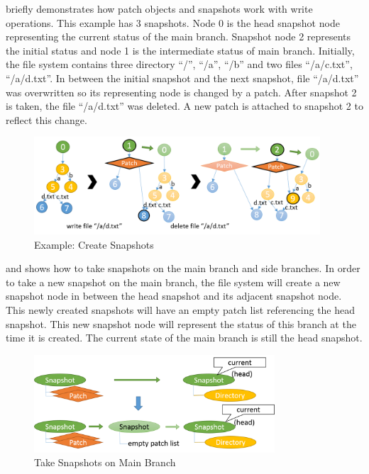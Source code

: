 	 briefly demonstrates how patch objects and snapshots work with write operations. This example has 3 snapshots. Node 0 is the head snapshot node representing the current status of the main branch. Snapshot node 2 represents the initial status and node 1 is the intermediate status of main branch. Initially, the file system contains three directory ``/'', ``/a'', ``/b'' and two files ``/a/c.txt'', ``/a/d.txt''. In between the initial snapshot and the next snapshot, file ``/a/d.txt'' was overwritten so its representing node is changed by a patch. After snapshot 2 is taken, the file ``/a/d.txt'' was deleted. A new patch is attached to snapshot 2 to reflect this change.

\begin{figure}[t]
\centering
\includegraphics[width=0.95\textwidth]{Chapter-4/figs/fig26.png}
\caption{Example: Create Snapshots}
\label{fig:create_snapshots}
\end{figure}

     and  shows how to take snapshots on the main branch and side branches. In order to take a new snapshot on the main branch, the file system will create a new snapshot node in between the head snapshot and its adjacent snapshot node. This newly created snapshots will have an empty patch list referencing the head snapshot. This new snapshot node will represent the status of this branch at the time it is created. The current state of the main branch is still the head snapshot.

\begin{figure}[t]
\centering
\includegraphics[width=0.8\textwidth]{Chapter-4/figs/fig20.png}
\caption{Take Snapshots on Main Branch}
\label{fig:take_snapshot_root}
\end{figure}
    
